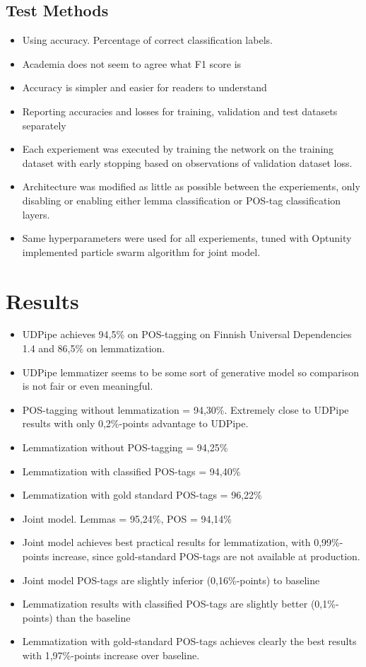 \documentclass[12pt,a4paper,english
]{tutthesis}
\begin{document}
\subsection{Test Methods}
\label{ss:test_methods}
\begin{itemize}
\item Using accuracy. Percentage of correct classification labels.
\item Academia does not seem to agree what F1 score is
\item Accuracy is simpler and easier for readers to understand
\item Reporting accuracies and losses for training, validation and test datasets separately
\item Each experiement was executed by training the network on the training dataset with early stopping based on observations of validation dataset loss.
\item Architecture was modified as little as possible between the experiements, only disabling or enabling either lemma classification or POS-tag classification layers.
\item Same hyperparameters were used for all experiements, tuned with Optunity implemented particle swarm algorithm for joint model.
\end{itemize}

\section{Results}
\label{se:results}
\begin{itemize}
\item UDPipe achieves 94,5\% on POS-tagging on Finnish Universal Dependencies 1.4 and 86,5\% on lemmatization.
\item UDPipe lemmatizer seems to be some sort of generative model so comparison is not fair or even meaningful.
\item POS-tagging without lemmatization = 94,30\%. Extremely close to UDPipe results with only 0,2\%-points advantage to UDPipe.
\item Lemmatization without POS-tagging = 94,25\%
\item Lemmatization with classified POS-tags = 94,40\%
\item Lemmatization with gold standard POS-tags = 96,22\%
\item Joint model. Lemmas = 95,24\%, POS = 94,14\%
\item Joint model achieves best practical results for lemmatization, with 0,99\%-points increase, since gold-standard POS-tags are not available at production.
\item Joint model POS-tags are slightly inferior (0,16\%-points) to baseline
\item Lemmatization results with classified POS-tags are slightly better (0,1\%-points) than the baseline
\item Lemmatization with gold-standard POS-tags achieves clearly the best results with 1,97\%-points increase over baseline.
\end{itemize}
\end{document}
